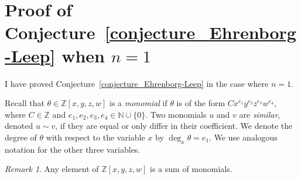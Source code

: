 \documentclass[12pt,table]{article}
\theoremstyle{definition}
\theoremstyle{remark}
\newtheorem{remark}[theorem]{Remark}
\newcommand{\Nnn}{\mathbb N}
\newcommand{\Zzz}{\mathbb Z}
\numberwithin{equation}{section}
\begin{document}
\section{Proof of Conjecture~\ref{conjecture_Ehrenborg-Leep} when $n=1$}
I have proved Conjecture~\ref{conjecture_Ehrenborg-Leep}
in the case where $n = 1$.


Recall that $ \theta \in \Zzz[x,y,z,w] $ is a \emph{monomial} if $ \theta $
is of the form $Cx^{e_1}y^{e_2}z^{e_3}w^{e_4}$, where $ C \in \Zzz $
and $ e_1,e_2,e_3,e_4 \in \Nnn \cup \{0\} $.
Two monomials $ u$ and $ v $ are \emph{similar}, denoted  $ u \sim v $,
if they are equal or only differ in their
coefficient.
We denote the degree of  $ \theta $ with respect to the variable $x$ 
by  $\deg_x \theta = e_1 $. We use analogous notation for the
other three variables.

\begin{remark}
Any element of $ \Zzz[x,y,z,w] $ is a sum of monomials.
\end{remark}
\end{document}
